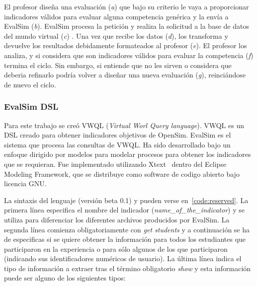 El profesor diseña una evaluación (\emph{a}) que bajo su criterio le vaya a proporcionar indicadores válidos para evaluar alguna competencia genérica y la envía a EvalSim (\emph{b}). EvalSim procesa la petición y realiza la solicitud a la base de datos del mundo virtual (\emph{c}) . Una vez que recibe los datos (\emph{d}), los transforma y devuelve los resultados debidamente formateados al profesor (\emph{e}). El profesor los analiza, y si considera que son indicadores válidos para evaluar la competencia (\emph{f}) termina el ciclo. Sin embargo, si entiende que no les sirven o considera que deberia refinarlo podría volver a diseñar una nueva evaluación (\emph{g}), reinciándose de nuevo el ciclo.

\subsubsection{EvalSim DSL}

Para este trabajo se creó VWQL (\emph{Virtual Worl Query language}). VWQL es un DSL creado para obtener indicadores objetivos de OpenSim. EvalSim es el sistema que procesa las consultas de VWQL. Ha sido desarrollado bajo un enfoque dirigido por modelos para modelar procesos para obtener los indicadores que se requieran. Fue implementado utilizando Xtext~\cite{eysholdt2010xtext} dentro del Eclipse Modeling Framework, que se distribuye como software de codigo abierto bajo licencia GNU.

La sintaxis del lenguaje (versión beta 0.1) y pueden verse en~\ref{code:reserved}. La primera línea especifica el nombre del indicador (\emph{name\_of\_the\_indicator}) y se utiliza para diferenciar los diferentes archivos producidos por EvalSim. La segunda línea comienza obligatoriamente con \emph{get students} y a continuación se ha de especificas si se quiere obtener la información para todos los estudiantes que participaron en la experiencia o para sólo algunos de los que participaron (indicando sus identificadores numéricos de usuario). La última línea indica el tipo de información a extraer tras el término obligatorio \emph{show} y esta información puede ser alguno de los siguientes tipos:

